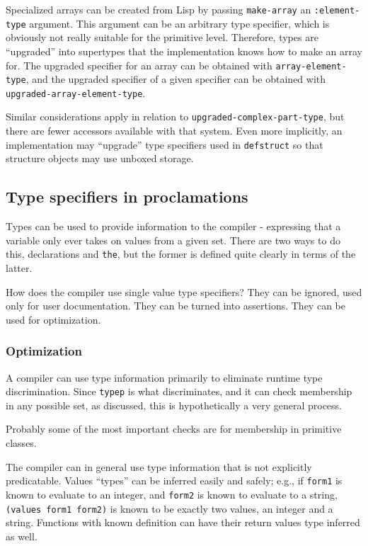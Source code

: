 \documentclass{article}
\begin{document}
Specialized arrays can be created from Lisp by passing \texttt{make-array} an \texttt{:element-type} argument. This argument can be an arbitrary type specifier, which is obviously not really suitable for the primitive level. Therefore, types are ``upgraded'' into supertypes that the implementation knows how to make an array for. The upgraded specifier for an array can be obtained with \texttt{array-element-type}, and the upgraded specifier of a given specifier can be obtained with \texttt{upgraded-array-element-type}.

Similar considerations apply in relation to \texttt{upgraded-complex-part-type}, but there are fewer accessors available with that system. Even more implicitly, an implementation may ``upgrade'' type specifiers used in \texttt{defstruct} so that structure objects may use unboxed storage.


\subsection{Type specifiers in proclamations}

Types can be used to provide information to the compiler - expressing that a variable only ever takes on values from a given set. There are two ways to do this, declarations and \texttt{the}, but the former is defined quite clearly in terms of the latter.

How does the compiler use single value type specifiers? They can be ignored, used only for user documentation. They can be turned into assertions. They can be used for optimization.


\subsubsection{Optimization}

A compiler can use type information primarily to eliminate runtime type discrimination. Since \texttt{typep} is what discriminates, and it can check membership in any possible set, as discussed, this is hypothetically a very general process.

Probably some of the most important checks are for membership in primitive classes.

The compiler can in general use type information that is not explicitly predicatable. Values ``types'' can be inferred easily and safely; e.g., if \texttt{form1} is known to evaluate to an integer, and \texttt{form2} is known to evaluate to a string, \texttt{(values form1 form2)} is known to be exactly two values, an integer and a string. Functions with known definition can have their return values type inferred as well.
\end{document}
